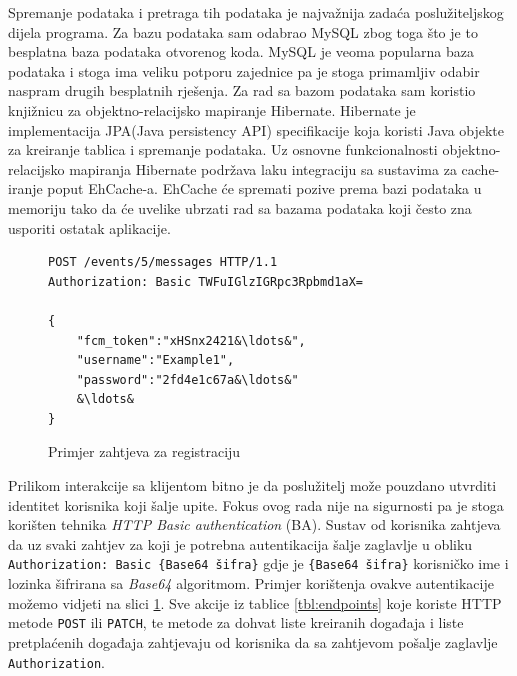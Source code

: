 \documentclass[times, utf8, zavrsni]{fer}
\begin{document}
Spremanje podataka i pretraga tih podataka je najvažnija zadaća poslužiteljskog dijela programa. Za bazu podataka sam odabrao MySQL zbog toga što je to besplatna baza podataka otvorenog koda. MySQL je veoma popularna baza podataka i stoga ima veliku potporu zajednice pa je stoga primamljiv odabir naspram drugih besplatnih rješenja. Za rad sa bazom podataka sam koristio knjižnicu za objektno-relacijsko mapiranje Hibernate. Hibernate je implementacija JPA(Java persistency API) specifikacije koja koristi Java objekte za kreiranje tablica i spremanje podataka. Uz osnovne funkcionalnosti objektno-relacijsko mapiranja Hibernate podržava laku integraciju sa sustavima za cache-iranje poput EhCache-a. EhCache će spremati pozive prema bazi podataka u memoriju tako da će uvelike ubrzati rad sa bazama podataka koji često zna usporiti ostatak aplikacije.

\begin{figure}
\begin{lstlisting}
POST /events/5/messages HTTP/1.1
Authorization: Basic TWFuIGlzIGRpc3Rpbmd1aX=

{
	"fcm_token":"xHSnx2421&\ldots&",
	"username":"Example1",
	"password":"2fd4e1c67a&\ldots&"
	&\ldots&
}
\end{lstlisting}
\caption{Primjer zahtjeva za registraciju}
\label{lst:register-request}
\end{figure}

Prilikom interakcije sa klijentom bitno je da poslužitelj može pouzdano utvrditi identitet korisnika koji šalje upite. Fokus ovog rada nije na sigurnosti pa je stoga korišten tehnika {\em HTTP Basic authentication} (BA). Sustav od korisnika zahtjeva da uz svaki zahtjev za koji je potrebna autentikacija šalje zaglavlje u obliku {\tt Authorization: Basic \{Base64 šifra\}} gdje je {\tt \{Base64 šifra\}} korisničko ime i lozinka šifrirana sa {\em Base64} algoritmom. Primjer korištenja ovakve autentikacije možemo vidjeti na slici \ref{lst:register-request}. Sve akcije iz tablice \ref{tbl:endpoints} koje koriste HTTP metode {\tt POST} ili {\tt PATCH}, te metode za dohvat liste kreiranih događaja i liste pretplaćenih događaja zahtjevaju od korisnika da sa zahtjevom pošalje zaglavlje {\tt Authorization}.
\end{document}
